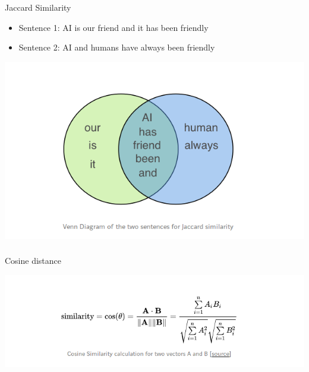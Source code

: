\documentclass[t, 10pt]{beamer}
\begin{document}
    \begin{frame} %
	\frametitle{\insertsection}
	\frametitle{\insertsubsection}
	
	Jaccard Similarity
	
	\begin{itemize}
		\item Sentence 1: AI is our friend and it has been friendly
		\item Sentence 2: AI and humans have always been friendly
	\end{itemize}
	\includegraphics[width=0.7\linewidth]{jac.png}
\end{frame}	%

    \begin{frame} %
	\frametitle{\insertsection}
	\frametitle{\insertsubsection}
	
	Cosine distance
	
	\includegraphics[width=0.9\linewidth]{cos.png}
\end{frame}	%
\end{document}

